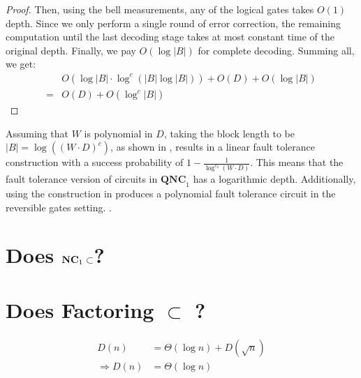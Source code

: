 \documentclass[manuscript,screen,review]{acmart}
\begin{document}
{\begin{proof}
  Then, using the bell measurements, any of the logical gates takes $O(1)$ depth. Since we only perform a single round of error correction, the remaining computation until the last decoding stage takes at most constant time of the original depth. Finally, we pay $O(\log |B|)$ for complete decoding. Summing all, we get: 
  \begin{equation*}
    \begin{split}
     &  O ( \log |B|\cdot  \log^{c}( |B| \log |B| ) )  + O ( D  ) + O ( \log |B| ) \\ 
     = & O ( D  ) + O ( \log^{c} |B| )
    \end{split}
  \end{equation*}
\end{proof}

Assuming that $W$ is polynomial in $D$, taking the block length to be $|B| = \log((W \cdot D)^c)$, as shown in , results in a linear fault tolerance construction with a success probability of $1 - \frac{1}{\log^{c_2}(W \cdot D)}$. This means that the fault tolerance version of circuits in $\textbf{QNC}_1$ has a logarithmic depth. Additionally, using the construction in \cite{aharonov1996limitationsnoisyreversiblecomputation} produces a polynomial fault tolerance circuit in the reversible gates setting. .



\section{ Does $\mathbf{NC}_{1} \subset $\noiseQNCon ?}


\section{ Does Factoring $\subset$ \noiseQNCon ?}

\begin{equation*}
  \begin{split}
    D(n) &= \Theta(\log n ) + D(\sqrt{n})\\
    \Rightarrow D(n) & = \Theta( \log n ) 
  \end{split}
\end{equation*}



%

}
\end{document}
